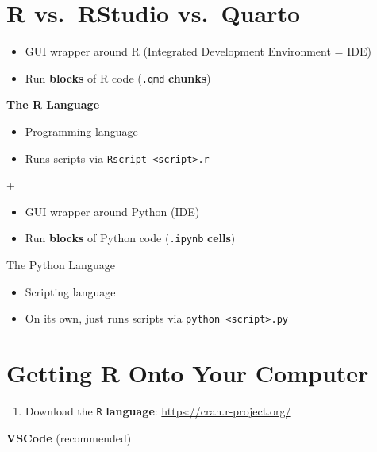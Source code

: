 \documentclass[
  letterpaper,
  DIV=11,
  numbers=noendperiod,
  oneside]{scrreprt}
\providecommand{\tightlist}{%
  \setlength{\itemsep}{0pt}\setlength{\parskip}{0pt}}\usepackage{longtable,booktabs,array}
\begin{document}
\hypertarget{r-vs.-rstudio-vs.-quarto}{%
\section{R vs.~RStudio vs.~Quarto}\label{r-vs.-rstudio-vs.-quarto}}

\begin{itemize}
\tightlist
\item
  GUI wrapper around R (Integrated Development Environment = IDE)
\item
  Run \textbf{blocks} of R code (\texttt{.qmd} \textbf{chunks})
\end{itemize}

\textbf{The R Language }

\begin{itemize}
\tightlist
\item
  Programming language
\item
  Runs scripts via \texttt{Rscript\ \textless{}script\textgreater{}.r}
\end{itemize}

+

\begin{itemize}
\tightlist
\item
  GUI wrapper around Python (IDE)
\item
  Run \textbf{blocks} of Python code (\texttt{.ipynb} \textbf{cells})
\end{itemize}

The Python Language

\begin{itemize}
\tightlist
\item
  Scripting language
\item
  On its own, just runs scripts via
  \texttt{python\ \textless{}script\textgreater{}.py}
\end{itemize}

\hypertarget{getting-r-onto-your-computer}{%
\section{Getting R Onto Your
Computer}\label{getting-r-onto-your-computer}}

\begin{enumerate}
\def\labelenumi{\arabic{enumi}.}
\tightlist
\item
  Download the \texttt{R} \textbf{language}:
  \url{https://cran.r-project.org/}
\end{enumerate}

\textbf{VSCode} (recommended)
\end{document}
